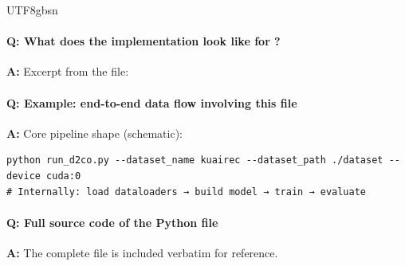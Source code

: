 \documentclass[11pt]{article}
\begin{document}
\begin{CJK*}{UTF8}{gbsn}
\paragraph{Q: What does the implementation look like for \texttt{}?}
\textbf{A:} Excerpt from the file:

\vspace{1mm}


\paragraph{Q: Example: end-to-end data flow involving this file}
\textbf{A:} Core pipeline shape (schematic):

\begin{Verbatim}[fontsize=\small]
python run_d2co.py --dataset_name kuairec --dataset_path ./dataset --device cuda:0
# Internally: load dataloaders → build model → train → evaluate
\end{Verbatim}

\paragraph{Q: Full source code of the Python file}
\textbf{A:} The complete file is included verbatim for reference.


\end{CJK*}
\end{document}
